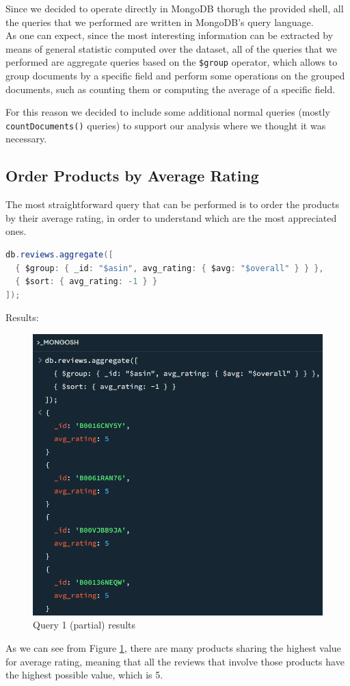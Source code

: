 Since we decided to operate directly in MongoDB thorugh the provided shell, all the queries that we performed are written in MongoDB's query language. \\

As one can expect, since the most interesting information can be extracted by means of general statistic computed over the dataset, all of the queries that we performed are aggregate queries based on the \texttt{\$group} operator, which allows to group documents by a specific field and perform some operations on the grouped documents, such as counting them or computing the average of a specific field.

For this reason we decided to include some additional normal queries (mostly \texttt{countDocuments()} queries) to support our analysis where we thought it was necessary. \\

\subsection{Order Products by Average Rating}
The most straightforward query that can be performed is to order the products by their average rating, in order to understand which are the most appreciated ones. \\
\begin{lstlisting}[language=Java]
db.reviews.aggregate([
  { $group: { _id: "$asin", avg_rating: { $avg: "$overall" } } },
  { $sort: { avg_rating: -1 } }
]);
\end{lstlisting}
\newpage
Results:
\begin{figure}[H]
  \centering
  \includegraphics[scale=0.6]{Images/q1_result.png}
  \caption{Query 1 (partial) results}
  \label{fig:q1_result}
\end{figure}
As we can see from Figure \ref{fig:q1_result}, there are many products sharing the highest value for average rating, meaning that all the reviews that involve those products have the highest possible value, which is 5.\\

